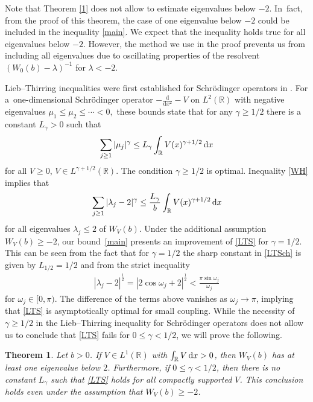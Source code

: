 \documentclass[pdftex]{sigma}%
\numberwithin{equation}{section}
\newtheorem{Theorem}{Theorem}[section]
\newcommand{\R}{\mathbb{R}}
\begin{document}
\begin{Remark}
Note that Theorem \ref{1} does not allow to estimate eigenvalues below $-2$. In~fact, from the proof of this theorem, the case of one eigenvalue below $-2$ could be included in the inequality \eqref{main}. We expect that the inequality holds true for all eigenvalues below $-2$. However, the method we use in the proof prevents us from including all eigenvalues due to oscillating properties of the resolvent $(W_0(b) - \lambda)^{-1}$ for $\lambda<-2$.
\end{Remark}

Lieb--Thirring inequalities were first established for Schr\"odinger operators in \cite{LT}. For a~one-dimensional Schr\"odinger operator ${-}\frac{\mathrm{d}}{\mathrm{d}x^2}-V$ on $L^2(\R)$ with negative eigenvalues \mbox{$\mu_1\le\mu_2\allowbreak\le\!\cdots\!<0,\!$} these bounds state that for any $\gamma\ge1/2$ there is a constant $L_\gamma>0$ such that
\begin{gather}
\sum_{j\ge 1}|\mu_j|^{\gamma}\le L_{\gamma}\int_{\R}V(x)^{\gamma+1/2}\, {\rm d} x
\label{LTSch}
\end{gather}
for all $V\ge0$, $V\in L^{\gamma+1/2}(\R)$. The condition $\gamma\ge1/2$ is optimal. Inequality \eqref{WH} implies that
\begin{gather}
\sum_{j\ge 1}|\lambda_j-2|^{\gamma}\le \frac{L_{\gamma}}{b}\int_{\R}V(x)^{\gamma+1/2}\, {\rm d} x
\label{LTS}
\end{gather}
for all eigenvalues $\lambda_j\le 2$ of $W_V(b)$. Under the additional assumption $W_V(b)\ge-2$, our bound~\eqref{main} presents an improvement of \eqref{LTS} for $\gamma=1/2$. This can be seen from the fact that for $\gamma=1/2$ the sharp constant in \eqref{LTSch} is given by $L_{1/2}=1/2$ \cite{HLT} and from the strict inequality
\begin{gather*}
|\lambda_j-2|^\frac12=|2\cos\omega_j+2|^\frac12<\frac{\pi\sin\omega_j}{\omega_j}
\end{gather*}
for $\omega_j\in[0,\pi)$.
The difference of the terms above vanishes as $\omega_j\to\pi$, implying that \eqref{LTS} is asymptotically optimal for small coupling. While the necessity of $\gamma\ge1/2$ in the Lieb--Thirring inequality for Schr\"odinger operators does not allow us to conclude that \eqref{LTS} fails for $0\le\gamma<1/2$, we will prove the following.

\begin{Theorem}\label{th:res}
Let $b>0$. If $V\in L^1(\R)$ with $\int_{\R}V\, {\rm d} x>0$, then $W_V(b)$ has at least one eigenvalue below $2$. Furthermore, if $0\le\gamma<1/2$, then there is no constant $L_\gamma$ such that \eqref{LTS} holds for all compactly supported $V$. This conclusion holds even under the assumption that $W_V(b)\ge-2$.
\end{Theorem}
\end{document}
